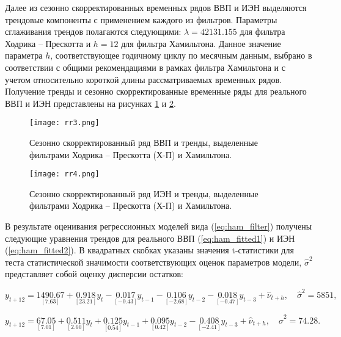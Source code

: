 \documentclass[a4paper,14pt]{extreport}
\begin{document}
	Далее из сезонно скорректированных временных рядов ВВП и ИЭН выделяются трендовые компоненты с применением каждого из фильтров. Параметры сглаживания трендов полагаются следующими: $\lambda=42131.155$ для фильтра Ходрика -- Прескотта \cite{esiMakingAlt} и $h=12$ для фильтра Хамильтона. Данное значение параметра $h$, соответствующее годичному циклу по месячным данным, выбрано в соответствии с общими рекомендациями в рамках фильтра Хамильтона и с учетом относительно короткой длины рассматриваемых временных рядов. Получение тренды и сезонно скорректированные временные ряды для реального ВВП и ИЭН представлены на рисунках \ref{fig:rr3} и \ref{fig:rr4}.
	
	\begin{figure}
		\texttt{[image: rr3.png]}
		\caption{
			Сезонно скорректированный ряд ВВП и тренды, 
			выделенные фильтрами Ходрика -- Прескотта (Х-П) и Хамильтона. 
		}
		\label{fig:rr3}
	\end{figure}	

	\begin{figure}
		\texttt{[image: rr4.png]}
		\caption{
			Сезонно скорректированный ряд ИЭН и тренды, 
			выделенные фильтрами Ходрика -- Прескотта (Х-П) и Хамильтона.
		}
		\label{fig:rr4}
	\end{figure}	

	В результате оценивания регрессионных моделей вида (\ref{eq:ham_filter}) получены следующие уравнения трендов для реального ВВП (\ref{eq:ham_fitted1}) и ИЭН (\ref{eq:ham_fitted2}). В квадратных скобках указаны значения t-статистики для теста статистической значимости соответствующих оценок параметров модели, $\hat{\sigma}^2$ представляет собой оценку дисперсии остатков:

	
	\begin{equation}
		y_{t+12} = \underset{[7.63]}{1490.67} 
		+ \underset{[23.21]}{0.918} y_{t}
		- \underset{[-0.43]}{0.017} y_{t-1}
		- \underset{[-2.68]}{0.106} y_{t-2}
		- \underset{[-0.47]}{0.018} y_{t-3}
		+ \hat{\nu}_{t+h}, \quad \hat{\sigma}^2=5851 ,
		\label{eq:ham_fitted1}
	\end{equation}
	
	\begin{equation}
		y_{t+12} = \underset{[7.01]}{67.05} 
		+ \underset{[2.60]}{0.511} y_{t}
		+ \underset{[0.54]}{0.125} y_{t-1}
		+ \underset{[0.42]}{0.095} y_{t-2}
		- \underset{[-2.41]}{0.408} y_{t-3}
		+ \hat{\nu}_{t+h}, \quad \hat{\sigma}^2=74.28 .
		\label{eq:ham_fitted2}
	\end{equation}
	
\end{document}
